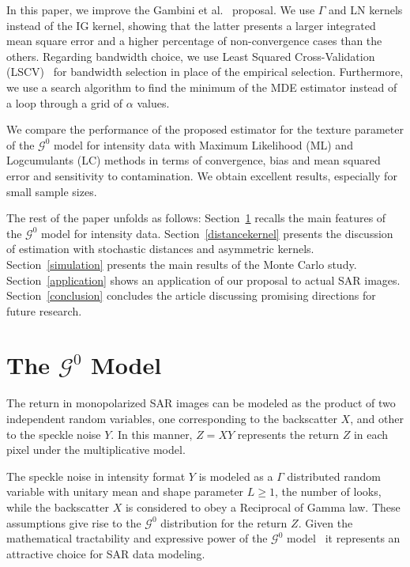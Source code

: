 \documentclass[twocolumn]{svjour3}
\begin{document}
	In this paper, we improve the Gambini et al.~\cite{gambini2015} proposal. 
	We use $\Gamma$ and LN kernels instead of the IG kernel, showing that the latter presents a larger integrated mean square error and a higher percentage of non-convergence cases than the others.
	Regarding bandwidth choice, we use Least Squared Cross-Validation (LSCV)~\cite{Rudemo1982} for bandwidth selection in place of the empirical selection. 
	Furthermore, we use a search algorithm to find the minimum of the MDE estimator instead of a loop through a grid of $\alpha$ values. 
	
	We compare the performance of the proposed estimator for the texture parameter of the $\mathcal{G}^0$ model for intensity data with Maximum Likelihood (ML) and Logcumulants (LC) methods in terms of convergence, bias and mean squared error and sensitivity to contamination. 
	We obtain excellent results, especially for small sample sizes.
	
	The rest of the paper unfolds as follows: 
	Section~\ref{sec_SAR} recalls the main features of the $\mathcal{G}^0$ model for intensity data.
	Section~\ref{distancekernel} presents the discussion of estimation with stochastic distances and asymmetric kernels. 
	Section~\ref{simulation} presents the main results of the Monte Carlo study. Section~\ref{application} shows an application of our proposal to actual SAR images.
	Section~\ref{conclusion} concludes the article discussing promising directions for future research.
	
	\section{The $\mathcal{G}^0$ Model}
	\label{sec_SAR}
	
	The return in monopolarized SAR images can be modeled as the product of two independent random variables, one corresponding to the backscatter $X$, and other to the speckle noise $Y$. 
	In this manner, $Z=X Y  $ represents the return $Z$ in each pixel under the multiplicative model.
	
	The speckle noise in intensity format $Y$ is modeled as a $\Gamma$ distributed random variable with unitary mean and shape parameter $L\geq1$, the number of looks, while the backscatter $X$ is considered to obey a Reciprocal of Gamma law. 
	These assumptions give rise to the $\mathcal{G}^{0}$ distribution for the return $Z$.
	Given the mathematical tractability and expressive power of the $\mathcal{G}^{0}$ model~\cite{MejailJacoboFreryBustos:IJRS,mejailfreryjacobobustos2001} it represents an attractive choice for SAR data modeling.
	
\end{document}
